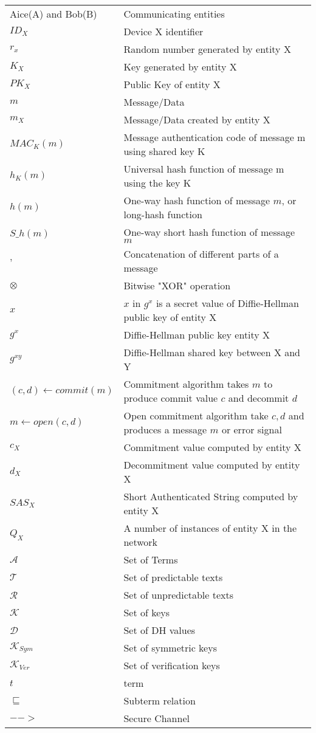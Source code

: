  \begin{longtable}[l]{p{100pt} p{200pt}} 
Aice(A) and Bob(B) & Communicating entities \\ 
$ID_X$ & Device X identifier \\ 
$r_x$ & Random number generated by entity X \\
$K_X$ & Key generated by entity X \\
$PK_X$ & Public Key of entity X \\ 
$m$ & Message/Data \\ 
$m_X$ & Message/Data created by entity X \\ 
$MAC_K(m)$ & Message authentication code of message m using shared key K \\ 
$h_K(m)$ & Universal hash function of message m using the key K \\ 
$h(m)$ & One-way hash function of message $m$, or long-hash function \\ 
$S\_h(m)$ & One-way short hash function of message $m$ \\
$,$ & Concatenation of different parts of a message\\ 
$\otimes$ & Bitwise "XOR" operation \\ 
$x$ & $x$ in $g^x$ is a secret value of Diffie-Hellman public key of entity X \\ 
$g^x$ & Diffie-Hellman public key entity X \\ 
$g^{xy}$ & Diffie-Hellman shared key between X and Y \\ 
$(c,d) \leftarrow commit(m)$ & Commitment algorithm takes $m$ to produce commit value $c$ and decommit $d$ \\ 
$m \leftarrow open(c,d)$ & Open commitment algorithm take $c,d$ and produces a message $m$ or error signal \\ 
$c_X$ & Commitment value computed by entity X \\
$d_X$ & Decommitment value computed by entity X \\
$SAS_X$ & Short Authenticated String computed by entity X \\ 
 $Q_X$ & A number of instances of entity X in the network \\ 
$\mathcal{A}$ & Set of Terms \\
$\mathcal{T}$ & Set of predictable texts \\
$\mathcal{R}$ & Set of unpredictable texts \\
$\mathcal{K}$ & Set of keys \\
$\mathcal{D}$ & Set of DH values \\
$\mathcal{K}_{Sym}$ & Set of symmetric keys \\
$\mathcal{K}_{Ver}$ & Set of verification keys \\
$t$ & term \\
$\sqsubseteq$ & Subterm relation \\
$-->$ & Secure Channel \\

\end{longtable} 
